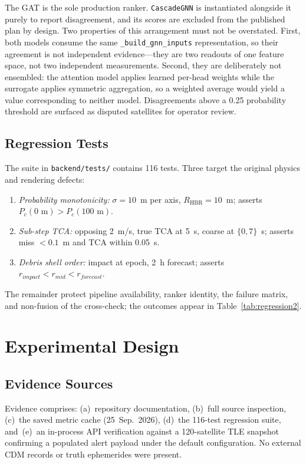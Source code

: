 \documentclass[conference]{IEEEtran}
\newcommand{\Pc}{P_c}
\newcommand{\RHBR}{R_{\mathrm{HBR}}}
\begin{document}
The GAT is the sole production ranker. \texttt{CascadeGNN} is instantiated
alongside it purely to report disagreement, and its scores are excluded from the
published plan by design. Two properties of this arrangement must not be
overstated. First, both models consume the same \texttt{\_build\_gnn\_inputs}
representation, so their agreement is not independent evidence---they are two
readouts of one feature space, not two independent measurements. Second, they are
deliberately not ensembled: the attention model applies learned per-head weights
while the surrogate applies symmetric aggregation, so a weighted average would
yield a value corresponding to neither model. Disagreements above a 0.25
probability threshold are surfaced as disputed satellites for operator review.

\subsection{Regression Tests}

The suite in \texttt{backend/tests/} contains 116 tests. Three target the
original physics and rendering defects:
\begin{enumerate}
  \item \emph{Probability monotonicity:} $\sigma=10$~m per axis,
        $\RHBR=10$~m; asserts $\Pc(0\text{ m}) > \Pc(100\text{ m})$.
  \item \emph{Sub-step TCA:} opposing 2~m/s, true TCA at 5~s, coarse at
        $\{0,7\}$~s; asserts miss $< 0.1$~m and TCA within 0.05~s.
  \item \emph{Debris shell order:} impact at epoch, 2~h forecast;
        asserts $r_{impact} < r_{mid} < r_{forecast}$.
\end{enumerate}
The remainder protect pipeline availability, ranker identity, the failure matrix,
and non-fusion of the cross-check; the outcomes appear in
Table~\ref{tab:regression2}.

\section{Experimental Design}
\label{sec:design}

\subsection{Evidence Sources}
Evidence comprises: (a)~repository documentation, (b)~full source inspection,
(c)~the saved metric cache (25~Sep.\ 2026), (d)~the 116-test regression suite,
and~(e)~an in-process API verification against a 120-satellite TLE snapshot
confirming a populated alert payload under the default configuration. No external
CDM records or truth ephemerides were present.
\end{document}
